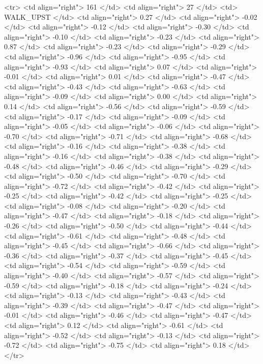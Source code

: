   <tr> <td align="right"> 161 </td> <td align="right">  27 </td> <td> WALK_UPST </td> <td align="right"> 0.27 </td> <td align="right"> -0.02 </td> <td align="right"> -0.12 </td> <td align="right"> -0.30 </td> <td align="right"> -0.10 </td> <td align="right"> -0.23 </td> <td align="right"> 0.87 </td> <td align="right"> -0.23 </td> <td align="right"> -0.29 </td> <td align="right"> -0.96 </td> <td align="right"> -0.95 </td> <td align="right"> -0.93 </td> <td align="right"> 0.07 </td> <td align="right"> -0.01 </td> <td align="right"> 0.01 </td> <td align="right"> -0.47 </td> <td align="right"> -0.43 </td> <td align="right"> -0.63 </td> <td align="right"> -0.09 </td> <td align="right"> 0.00 </td> <td align="right"> 0.14 </td> <td align="right"> -0.56 </td> <td align="right"> -0.59 </td> <td align="right"> -0.17 </td> <td align="right"> -0.09 </td> <td align="right"> -0.05 </td> <td align="right"> -0.06 </td> <td align="right"> -0.70 </td> <td align="right"> -0.71 </td> <td align="right"> -0.68 </td> <td align="right"> -0.16 </td> <td align="right"> -0.38 </td> <td align="right"> -0.16 </td> <td align="right"> -0.38 </td> <td align="right"> -0.48 </td> <td align="right"> -0.46 </td> <td align="right"> -0.29 </td> <td align="right"> -0.50 </td> <td align="right"> -0.70 </td> <td align="right"> -0.72 </td> <td align="right"> -0.42 </td> <td align="right"> -0.25 </td> <td align="right"> -0.42 </td> <td align="right"> -0.25 </td> <td align="right"> -0.08 </td> <td align="right"> -0.20 </td> <td align="right"> -0.47 </td> <td align="right"> -0.18 </td> <td align="right"> -0.26 </td> <td align="right"> -0.50 </td> <td align="right"> -0.44 </td> <td align="right"> -0.61 </td> <td align="right"> -0.48 </td> <td align="right"> -0.45 </td> <td align="right"> -0.66 </td> <td align="right"> -0.36 </td> <td align="right"> -0.37 </td> <td align="right"> -0.45 </td> <td align="right"> -0.54 </td> <td align="right"> -0.59 </td> <td align="right"> -0.40 </td> <td align="right"> -0.57 </td> <td align="right"> -0.59 </td> <td align="right"> -0.18 </td> <td align="right"> -0.24 </td> <td align="right"> -0.13 </td> <td align="right"> -0.43 </td> <td align="right"> -0.39 </td> <td align="right"> -0.47 </td> <td align="right"> -0.01 </td> <td align="right"> -0.46 </td> <td align="right"> -0.47 </td> <td align="right"> 0.12 </td> <td align="right"> -0.61 </td> <td align="right"> -0.52 </td> <td align="right"> -0.13 </td> <td align="right"> -0.72 </td> <td align="right"> -0.75 </td> <td align="right"> 0.18 </td> </tr>
